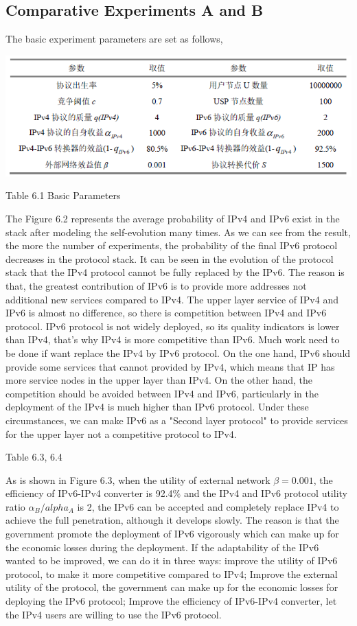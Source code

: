 \documentclass{article}
\begin{document}
\subsection{Comparative Experiments A and B}
The basic experiment parameters are set as follows,
\par
\centerline{\includegraphics[width=.7\textwidth]{Table5.png}}
\centerline{Table 6.1 Basic Parameters}
The Figure 6.2 represents the average probability of IPv4 and IPv6 exist in the stack after modeling the self-evolution
many times. As we can see from the result, the more the number of experiments, the probability of the final IPv6 protocol
decreases in the protocol stack. It can be seen in the evolution of the protocol stack that the IPv4 protocol cannot be
fully replaced by the IPv6. The reason is that, the greatest contribution of IPv6 is to provide more addresses not
additional new services compared to IPv4. The upper layer service of IPv4 and IPv6 is almost no difference,  so there
is competition between IPv4 and IPv6 protocol. IPv6 protocol is not widely deployed, so its quality indicators is lower
than IPv4, that's why IPv4 is more competitive than IPv6. Much work need to be done if want replace the IPv4 by IPv6
protocol. On the one hand, IPv6 should provide some services that cannot provided by IPv4, which means that IP has more
service nodes in the upper layer than IPv4. On the other hand, the competition should be avoided between IPv4 and IPv6,
particularly in the deployment of the IPv4 is much higher than IPv6 protocol. Under these circumstances, we can make
IPv6 as a "Second layer protocol" to provide services for the upper layer not a competitive protocol to IPv4.

Table 6.3, 6.4

As is shown in Figure 6.3, when the utility of external network $\beta=0.001$, the efficiency of IPv6-IPv4 converter is
92.4\% and the IPv4 and IPv6 protocol utility ratio $\alpha_B/alpha_A$ is 2, the IPv6 can be accepted and completely
replace IPv4 to achieve the full penetration, although it develops slowly.   The reason is that the government promote
the deployment of IPv6 vigorously which can make up for the economic losses during the deployment. If the adaptability
of the IPv6 wanted to be improved, we can do it in three ways: improve the utility of IPv6 protocol, to make it more
competitive compared to IPv4; Improve the external utility of the protocol, the government can make up for the economic
losses for deploying the IPv6 protocol; Improve the efficiency of IPv6-IPv4 converter, let the IPv4 users are willing
to use the IPv6 protocol.
\end{document}
